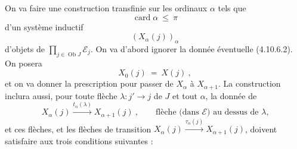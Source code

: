 \documentclass[11pt]{article}
\newcommand{\printedpage}[1]{\marginpar{\footnotesize p.~#1}}
\newcommand{\msp}[1]{\marginpar{\footnotesize [#1]}}
\newcommand{\Ob}{\operatorname{Ob}}
\newcommand{\card}{\operatorname{card}}
\begin{document}
On va faire une construction transfinie sur les ordinaux $\alpha$ tels que
\[
\card\alpha\ \leqslant\ \pi
\]
d'un système inductif
\[
(X_\alpha(j))_\alpha
\]
d'objets de $\prod_{j\in\Ob J}\mathcal{E}_j$. On va d'abord ignorer la donnée éventuelle (4.10.6.2). On posera
\[
X_0(j)\ =\ X(j)\ , \tag*{(4.10.6.4)}
\]
et on va donner la prescription pour passer de $X_\alpha$ à $X_{\alpha+1}$. La construction inclura aussi, pour toute flèche $\lambda : j'\longrightarrow j$ de $J$ et tout $\alpha$, la donnée de
\[
X_\alpha(j) \xrightarrow{t_\alpha(\lambda)} X_{\alpha+1}(j)\ , \qquad \text{flèche (dans $\mathcal{E}$) au dessus de $\lambda$,} \tag*{(4.10.6.5)} %
\]
et ces flèches, et les flèches de transition $X_\alpha(j)\xrightarrow{\tau_\alpha(j)}X_{\alpha+1}(j)$, doivent
\printedpage{97}
\msp{256}
satisfaire aux trois conditions suivantes :
\end{document}
